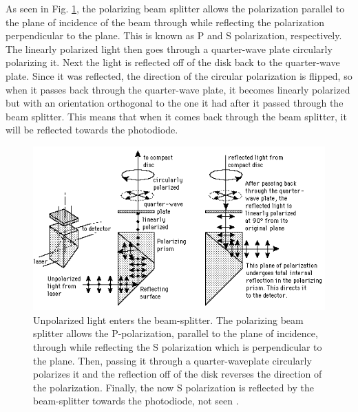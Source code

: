 \documentclass[ notitlepage, numerical, 11pt]{revtex4-1} %
\begin{document}
As seen in Fig. \ref{prism}, the polarizing beam splitter allows the polarization parallel to the plane of incidence of the beam through while reflecting the polarization perpendicular to the plane. This is known as P and S polarization, respectively. The linearly polarized light then goes through a quarter-wave plate circularly polarizing it. Next the light is reflected off of the disk back to the quarter-wave plate. Since it was reflected, the direction of the circular polarization is flipped, so when it passes back through the quarter-wave plate, it becomes linearly polarized but with an orientation orthogonal to the one it had after it passed through the beam splitter. This means that when it comes back through the beam splitter, it will be reflected towards the photodiode. 
\begin{figure}[H]
\centerline{\includegraphics[scale=1.1]{prism.png}}
\caption{Unpolarized light enters the beam-splitter. The polarizing beam splitter allows the P-polarization, parallel to the plane of incidence, through while reflecting the S polarization which is perpendicular to the plane. Then, passing it through a quarter-waveplate circularly polarizes it and the reflection off of the disk reverses the direction of the polarization. Finally, the now S polarization is reflected by the beam-splitter towards the photodiode, not seen \cite {hyper, optics}.}
\label{prism}
\end{figure} 
\end{document}
